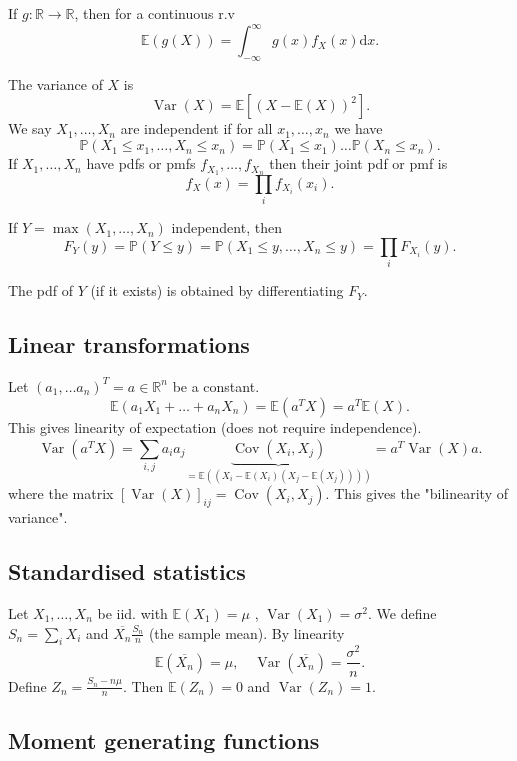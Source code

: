 \documentclass[a4paper]{scrartcl}
\begin{document}
If $g: \mathbb{R} \to \mathbb{R} $, then for a continuous r.v \[
\mathbb{E} (g (X))=\int_{-\infty }^{\infty} g (x) f_X (x)\mathrm{d}x
.\] 

The variance of $X$ is \[
\operatorname{Var} (X)= \mathbb{E} [(X-\mathbb{E}(X))^2]
.\] 
We say $X_1 , \ldots ,X_n$ are independent if for all $x_1 , \ldots , x_n$ we have \[
\mathbb{P} (X_1 \leq x_1 , \ldots ,X_n \leq x_n )=\mathbb{P}(X_1 \leq x_1) \ldots \mathbb{P}(X_n \leq x_n)
.\] 
If $X_1 , \ldots ,X_n $ have pdfs or pmfs $f_{X_1 }, \ldots,f_{X_n } $ then their joint pdf or pmf is \[
f_X (x)=\prod_{i}f_{X_i}(x_i)
.\] 

If $Y=\max (X_1 , \ldots ,X_n)$ independent, then \[
F_Y (y)=\mathbb{P} (Y \leq y)=\mathbb{P} (X_1 \leq y , \ldots ,X_n \leq y )=\prod_{i}F_{X_i}(y)
.\] 

The pdf of $Y$ (if it exists) is obtained by differentiating $F_Y$.
\subsection{Linear transformations}
Let $(a_1 , \ldots a_n)^T=a \in \mathbb{R}^{n}$ be a constant. \[
\mathbb{E} (a_1 X_1 +\ldots +a_n X_n)=\mathbb{E}(a^{T}X)=a^{T}\mathbb{E}(X)
.\]
This gives linearity of expectation (does not require independence). 
\[
\operatorname{Var}(a^{T}X)=\sum_{i,j}^{}a_{i}a_{j}\underbrace{\operatorname{Cov}(X_{i}, X_{j})}_{=\mathbb{E}((X_{i}-\mathbb{E}(X_{i})(X_{j}-\mathbb{E}(X_{j}))))} =a^{T}\operatorname{Var}(X)a
.\] 
where the matrix $[\operatorname{Var}(X)]_{ij}=\operatorname{Cov}(X_{i},X_{j})$. This gives the "bilinearity of variance".
\subsection{Standardised statistics}
Let $X_1 , \ldots , X_n$ be iid. with $\mathbb{E}(X_1 )=\mu$ , $\operatorname{Var}(X_1)=\sigma^2$. We define $S_n=\sum_{i}^{}X_{i}$ and $\overline{X_n} \frac{S_n}{n} $ (the sample mean). By linearity \[
\mathbb{E} (\overline{X_n} )=\mu, \quad \operatorname{Var }(\overline{X_n} )= \frac{\sigma^2}{n}
.\]   
Define $Z_{n}= \frac{S_{n}-n \mu}{n}$. Then $\mathbb{E}(Z_{n})=0$ and $\operatorname{Var}(Z_{n})=1$. 

\subsection{Moment generating functions}
\end{document}
